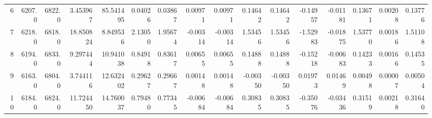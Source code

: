\begin{longtable}{rrrrrrrrrrrrrrrr}
           6 &          6207.0 &          6822.0 &            3.453967 &             85.541495 &                    0.04026 &                           0.03867 &                                     0.00971 &                                    0.00971 &                                            0.14642 &                                           0.14642 &                                      -0.14957 &                                           -0.01181 &                 0.13671 &                0.00208 &                   0.13776 \\
           7 &          6218.0 &          6818.0 &           18.850824 &              8.849536 &                    2.13050 &                           1.95674 &                                    -0.00314 &                                   -0.00314 &                                            1.53456 &                                           1.53456 &                                      -1.52983 &                                           -0.01875 &                 1.53770 &                0.00186 &                   1.51108 \\
           8 &          6194.0 &          6833.0 &            9.297444 &             10.941038 &                    0.84918 &                           0.83617 &                                     0.00655 &                                    0.00655 &                                            0.14888 &                                           0.14888 &                                      -0.15218 &                                           -0.00683 &                 0.14233 &                0.00166 &                   0.14535 \\
           9 &          6163.0 &          6804.0 &            3.744116 &             12.632402 &                    0.29627 &                           0.29667 &                                     0.00148 &                                    0.00148 &                                           -0.00350 &                                          -0.00350 &                                       0.01973 &                                            0.01469 &                 0.00498 &                0.00007 &                   0.00504 \\
          10 &          6184.0 &          6824.0 &           11.724450 &             14.760037 &                    0.79480 &                           0.77345 &                                    -0.00684 &                                   -0.00684 &                                            0.30835 &                                           0.30835 &                                      -0.35076 &                                           -0.03436 &                 0.31519 &                0.00218 &                   0.31640 \\
\end{longtable}
